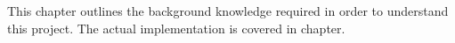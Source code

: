 This chapter outlines the background knowledge required in order to understand this project. The actual implementation is covered in chapter.







